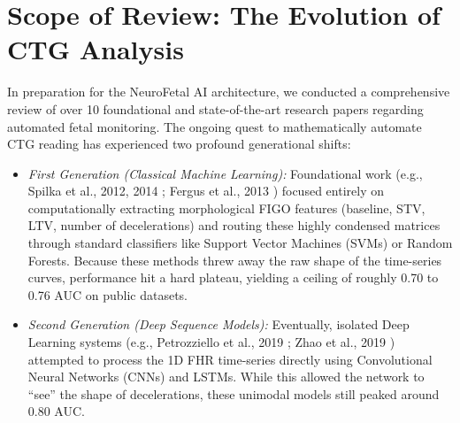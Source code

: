 \documentclass[12pt,a4paper]{report}
\begin{document}
\section{Scope of Review: The Evolution of CTG Analysis}
In preparation for the NeuroFetal AI architecture, we conducted a comprehensive review of over 10 foundational and state-of-the-art research papers regarding automated fetal monitoring. The ongoing quest to mathematically automate CTG reading has experienced two profound generational shifts:
\begin{itemize}
    \item \textit{First Generation (Classical Machine Learning):} Foundational work (e.g., Spilka et al., 2012, 2014 \cite{spilka1, spilka2}; Fergus et al., 2013 \cite{fergus}) focused entirely on computationally extracting morphological FIGO features (baseline, STV, LTV, number of decelerations) and routing these highly condensed matrices through standard classifiers like Support Vector Machines (SVMs) or Random Forests. Because these methods threw away the raw shape of the time-series curves, performance hit a hard plateau, yielding a ceiling of roughly 0.70 to 0.76 AUC on public datasets.
    \item \textit{Second Generation (Deep Sequence Models):} Eventually, isolated Deep Learning systems (e.g., Petrozziello et al., 2019 \cite{petrozziello}; Zhao et al., 2019 \cite{zhao}) attempted to process the 1D FHR time-series directly using Convolutional Neural Networks (CNNs) and LSTMs. While this allowed the network to ``see'' the shape of decelerations, these unimodal models still peaked around 0.80 AUC.
\end{itemize}
\end{document}
